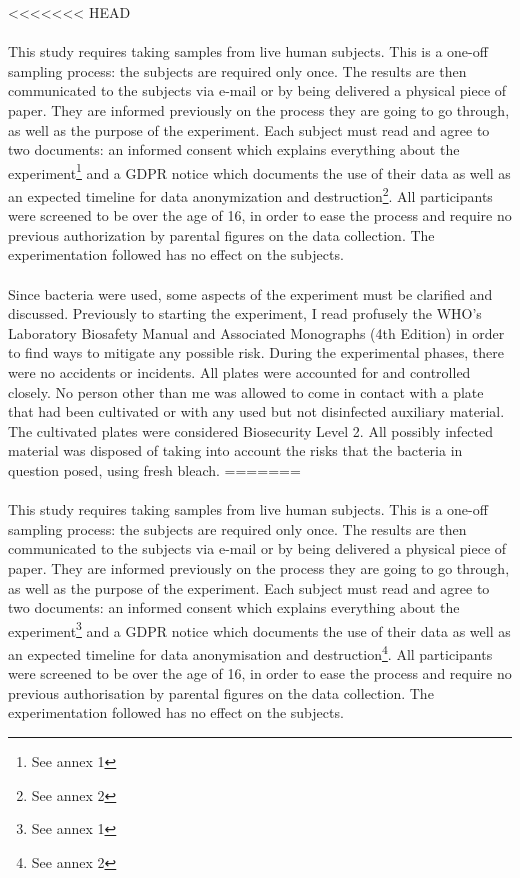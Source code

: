 <<<<<<< HEAD
\paragraph{}This study requires taking samples from live human subjects. This is a one-off sampling process: the subjects are required only once. The results are then communicated to the subjects via e-mail or by being delivered a physical piece of paper. They are informed previously on the process they are going to go through, as well as the purpose of the experiment. Each subject must read and agree to two documents: an informed consent which explains everything about the experiment\footnote{See annex 1} and a GDPR notice which documents the use of their data as well as an expected timeline for data anonymization and destruction\footnote{See annex 2}. All participants were screened to be over the age of 16, in order to ease the process and require no previous authorization by parental figures on the data collection. The experimentation followed has no effect on the subjects\cite{WhatGDPREU2018}.
\paragraph{}Since bacteria were used, some aspects of the experiment must be clarified and discussed. Previously to starting the experiment, I read profusely the WHO's Laboratory Biosafety Manual and Associated Monographs (4th Edition)\cite{worldhealthorganizationLaboratoryBiosafetyManual2020} in order to find ways to mitigate any possible risk. During the experimental phases, there were no accidents or incidents. All plates were accounted for and controlled closely. No person other than me was allowed to come in contact with a plate that had been cultivated or with any used but not disinfected auxiliary material. The cultivated plates were considered Biosecurity Level 2. All possibly infected material was disposed of taking into account the risks that the bacteria in question posed, using fresh bleach.
=======
\paragraph{}This study requires taking samples from live human subjects. This is a one-off sampling process: the subjects are required only once. The results are then communicated to the subjects via e-mail or by being delivered a physical piece of paper. They are informed previously on the process they are going to go through, as well as the purpose of the experiment. Each subject must read and agree to two documents: an informed consent which explains everything about the experiment\footnote{See annex 1} and a GDPR notice which documents the use of their data as well as an expected timeline for data anonymisation and destruction\footnote{See annex 2}. All participants were screened to be over the age of 16, in order to ease the process and require no previous authorisation by parental figures on the data collection. The experimentation followed has no effect on the subjects\cite{WhatGDPREU2018}.
